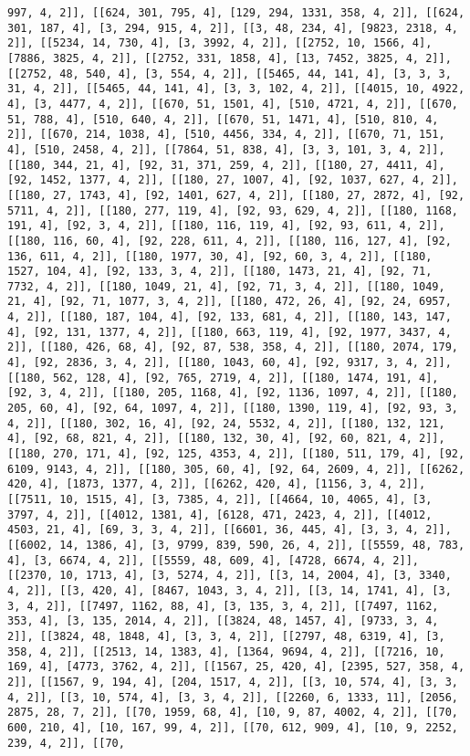\documentclass[12pt,fleqn]{article}\usepackage{../../common}
\begin{document}
\begin{verbatim}
997, 4, 2]], [[624, 301, 795, 4], [129, 294, 1331, 358, 4, 2]], [[624, 301, 187, 4], [3, 294, 915, 4, 2]], [[3, 48, 234, 4], [9823, 2318, 4, 2]], [[5234, 14, 730, 4], [3, 3992, 4, 2]], [[2752, 10, 1566, 4], [7886, 3825, 4, 2]], [[2752, 331, 1858, 4], [13, 7452, 3825, 4, 2]], [[2752, 48, 540, 4], [3, 554, 4, 2]], [[5465, 44, 141, 4], [3, 3, 3, 31, 4, 2]], [[5465, 44, 141, 4], [3, 3, 102, 4, 2]], [[4015, 10, 4922, 4], [3, 4477, 4, 2]], [[670, 51, 1501, 4], [510, 4721, 4, 2]], [[670, 51, 788, 4], [510, 640, 4, 2]], [[670, 51, 1471, 4], [510, 810, 4, 2]], [[670, 214, 1038, 4], [510, 4456, 334, 4, 2]], [[670, 71, 151, 4], [510, 2458, 4, 2]], [[7864, 51, 838, 4], [3, 3, 101, 3, 4, 2]], [[180, 344, 21, 4], [92, 31, 371, 259, 4, 2]], [[180, 27, 4411, 4], [92, 1452, 1377, 4, 2]], [[180, 27, 1007, 4], [92, 1037, 627, 4, 2]], [[180, 27, 1743, 4], [92, 1401, 627, 4, 2]], [[180, 27, 2872, 4], [92, 5711, 4, 2]], [[180, 277, 119, 4], [92, 93, 629, 4, 2]], [[180, 1168, 191, 4], [92, 3, 4, 2]], [[180, 116, 119, 4], [92, 93, 611, 4, 2]], [[180, 116, 60, 4], [92, 228, 611, 4, 2]], [[180, 116, 127, 4], [92, 136, 611, 4, 2]], [[180, 1977, 30, 4], [92, 60, 3, 4, 2]], [[180, 1527, 104, 4], [92, 133, 3, 4, 2]], [[180, 1473, 21, 4], [92, 71, 7732, 4, 2]], [[180, 1049, 21, 4], [92, 71, 3, 4, 2]], [[180, 1049, 21, 4], [92, 71, 1077, 3, 4, 2]], [[180, 472, 26, 4], [92, 24, 6957, 4, 2]], [[180, 187, 104, 4], [92, 133, 681, 4, 2]], [[180, 143, 147, 4], [92, 131, 1377, 4, 2]], [[180, 663, 119, 4], [92, 1977, 3437, 4, 2]], [[180, 426, 68, 4], [92, 87, 538, 358, 4, 2]], [[180, 2074, 179, 4], [92, 2836, 3, 4, 2]], [[180, 1043, 60, 4], [92, 9317, 3, 4, 2]], [[180, 562, 128, 4], [92, 765, 2719, 4, 2]], [[180, 1474, 191, 4], [92, 3, 4, 2]], [[180, 205, 1168, 4], [92, 1136, 1097, 4, 2]], [[180, 205, 60, 4], [92, 64, 1097, 4, 2]], [[180, 1390, 119, 4], [92, 93, 3, 4, 2]], [[180, 302, 16, 4], [92, 24, 5532, 4, 2]], [[180, 132, 121, 4], [92, 68, 821, 4, 2]], [[180, 132, 30, 4], [92, 60, 821, 4, 2]], [[180, 270, 171, 4], [92, 125, 4353, 4, 2]], [[180, 511, 179, 4], [92, 6109, 9143, 4, 2]], [[180, 305, 60, 4], [92, 64, 2609, 4, 2]], [[6262, 420, 4], [1873, 1377, 4, 2]], [[6262, 420, 4], [1156, 3, 4, 2]], [[7511, 10, 1515, 4], [3, 7385, 4, 2]], [[4664, 10, 4065, 4], [3, 3797, 4, 2]], [[4012, 1381, 4], [6128, 471, 2423, 4, 2]], [[4012, 4503, 21, 4], [69, 3, 3, 4, 2]], [[6601, 36, 445, 4], [3, 3, 4, 2]], [[6002, 14, 1386, 4], [3, 9799, 839, 590, 26, 4, 2]], [[5559, 48, 783, 4], [3, 6674, 4, 2]], [[5559, 48, 609, 4], [4728, 6674, 4, 2]], [[2370, 10, 1713, 4], [3, 5274, 4, 2]], [[3, 14, 2004, 4], [3, 3340, 4, 2]], [[3, 420, 4], [8467, 1043, 3, 4, 2]], [[3, 14, 1741, 4], [3, 3, 4, 2]], [[7497, 1162, 88, 4], [3, 135, 3, 4, 2]], [[7497, 1162, 353, 4], [3, 135, 2014, 4, 2]], [[3824, 48, 1457, 4], [9733, 3, 4, 2]], [[3824, 48, 1848, 4], [3, 3, 4, 2]], [[2797, 48, 6319, 4], [3, 358, 4, 2]], [[2513, 14, 1383, 4], [1364, 9694, 4, 2]], [[7216, 10, 169, 4], [4773, 3762, 4, 2]], [[1567, 25, 420, 4], [2395, 527, 358, 4, 2]], [[1567, 9, 194, 4], [204, 1517, 4, 2]], [[3, 10, 574, 4], [3, 3, 4, 2]], [[3, 10, 574, 4], [3, 3, 4, 2]], [[2260, 6, 1333, 11], [2056, 2875, 28, 7, 2]], [[70, 1959, 68, 4], [10, 9, 87, 4002, 4, 2]], [[70, 600, 210, 4], [10, 167, 99, 4, 2]], [[70, 612, 909, 4], [10, 9, 2252, 239, 4, 2]], [[70, 
\end{verbatim}
\end{document}
